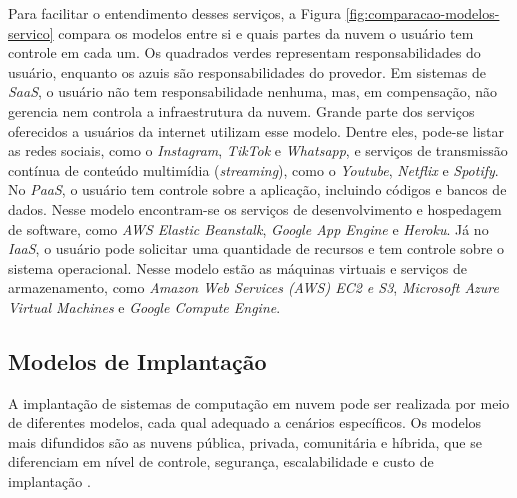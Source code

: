 Para facilitar o entendimento desses serviços, a Figura \ref{fig:comparacao-modelos-servico} compara os modelos entre si e quais partes da nuvem o usuário tem controle em cada um. Os quadrados verdes representam responsabilidades do usuário, enquanto os azuis são responsabilidades do provedor. Em sistemas de \textit{SaaS}, o usuário não tem responsabilidade nenhuma, mas, em compensação, não gerencia nem controla a infraestrutura da nuvem. Grande parte dos serviços oferecidos a usuários da internet utilizam esse modelo. Dentre eles, pode-se listar as redes sociais, como o \textit{Instagram}, \textit{TikTok} e \textit{Whatsapp}, e serviços de transmissão contínua de conteúdo multimídia (\textit{streaming}), como o \textit{Youtube}, \textit{Netflix} e \textit{Spotify}.  No \textit{PaaS}, o usuário tem controle sobre a aplicação, incluindo códigos e bancos de dados. Nesse modelo encontram-se os serviços de desenvolvimento e hospedagem de software, como \textit{AWS Elastic Beanstalk}, \textit{Google App Engine} e \textit{Heroku}. Já no \textit{IaaS}, o usuário pode solicitar uma quantidade de recursos e tem controle sobre o sistema operacional. Nesse modelo estão as máquinas virtuais e serviços de armazenamento, como  \textit{Amazon Web Services (AWS) EC2 e S3},  \textit{Microsoft Azure Virtual Machines} e  \textit{Google Compute Engine}.

\subsection{Modelos de Implantação}

A implantação de sistemas de computação em nuvem pode ser realizada por meio de diferentes modelos, cada qual adequado a cenários específicos. Os modelos mais difundidos são as nuvens pública, privada, comunitária e híbrida, que se diferenciam em nível de controle, segurança, escalabilidade e custo de implantação \cite{mell2011}.

